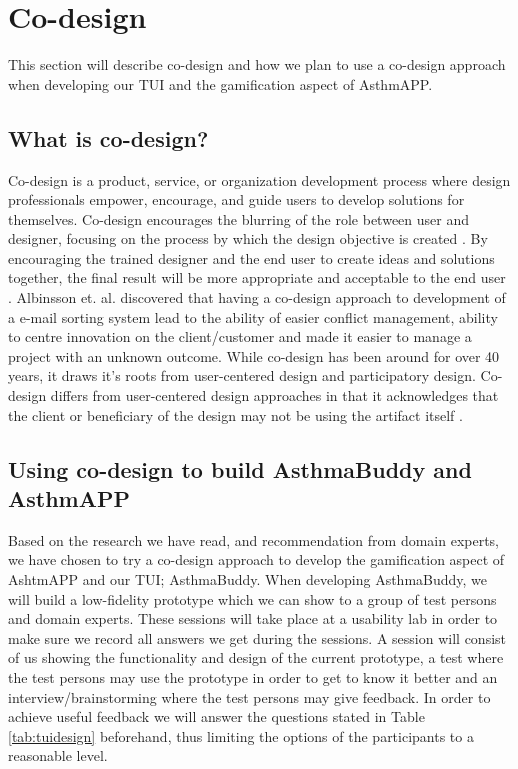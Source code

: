 \section{Co-design}
\label{sec:codesign}
This section will describe co-design and how we plan to use a co-design approach when developing our TUI and the gamification aspect of AsthmAPP.

\subsection{What is co-design?}
Co-design is a product, service, or organization development process where design professionals empower, encourage, and guide users to develop solutions for themselves. Co-design encourages the blurring of the role between user and designer, focusing on the process by which the design objective is created \cite{sanders2008co}. By encouraging the trained designer and the end user to create ideas and solutions together, the final result will be more appropriate and acceptable to the end user \cite{albinsson2007co}. 
Albinsson et. al. \cite{albinsson2007co} discovered that having a co-design approach to development of a e-mail sorting system lead to the ability of easier conflict management, ability to centre innovation on the client/customer and made it easier to manage a project with an unknown outcome. While co-design has been around for over 40 years, it draws it's roots from user-centered design and participatory design. Co-design differs from user-centered design approaches in that it acknowledges that the client or beneficiary of the design may not be using the artifact itself \cite{norman1986user}.



\subsection{Using co-design to build AsthmaBuddy and AsthmAPP}
Based on the research we have read, and recommendation from domain experts, we have chosen to try a co-design approach to develop the gamification aspect of AshtmAPP and our TUI; AsthmaBuddy. 
When developing AsthmaBuddy, we will build a low-fidelity prototype which we can show to a group of test persons and domain experts. These sessions will take place at a usability lab in order to make sure we record all answers we get during the sessions. A session will consist of us showing the functionality and design of the current prototype, a test where the test persons may use the prototype in order to get to know it better and an interview/brainstorming where the test persons may give feedback. In order to achieve useful feedback we will answer the questions stated in Table \ref{tab:tuidesign} beforehand, thus limiting the options of the participants to a reasonable level. 

